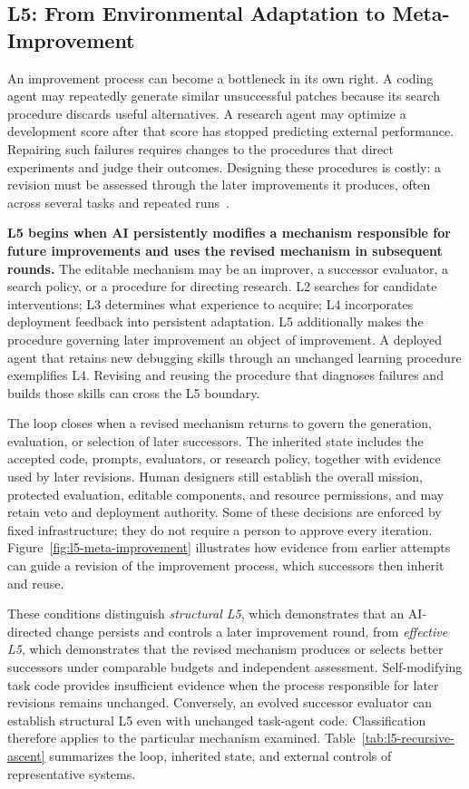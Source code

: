 \subsection{L5: From Environmental Adaptation to Meta-Improvement}
\label{sec:l5-meta-improvement}

An improvement process can become a bottleneck in its own right. A coding agent may repeatedly generate similar unsuccessful patches because its search procedure discards useful alternatives. A research agent may optimize a development score after that score has stopped predicting external performance. Repairing such failures requires changes to the procedures that direct experiments and judge their outcomes. Designing these procedures is costly: a revision must be assessed through the later improvements it produces, often across several tasks and repeated runs~\cite{zelikman2024stop,shi2026aevolvetraining}.

\textbf{L5 begins when AI persistently modifies a mechanism responsible for future improvements and uses the revised mechanism in subsequent rounds.} The editable mechanism may be an improver, a successor evaluator, a search policy, or a procedure for directing research. L2 searches for candidate interventions; L3 determines what experience to acquire; L4 incorporates deployment feedback into persistent adaptation. L5 additionally makes the procedure governing later improvement an object of improvement. A deployed agent that retains new debugging skills through an unchanged learning procedure exemplifies L4. Revising and reusing the procedure that diagnoses failures and builds those skills can cross the L5 boundary.

The loop closes when a revised mechanism returns to govern the generation, evaluation, or selection of later successors. The inherited state includes the accepted code, prompts, evaluators, or research policy, together with evidence used by later revisions. Human designers still establish the overall mission, protected evaluation, editable components, and resource permissions, and may retain veto and deployment authority. Some of these decisions are enforced by fixed infrastructure; they do not require a person to approve every iteration. Figure~\ref{fig:l5-meta-improvement} illustrates how evidence from earlier attempts can guide a revision of the improvement process, which successors then inherit and reuse.

These conditions distinguish \emph{structural L5}, which demonstrates that an AI-directed change persists and controls a later improvement round, from \emph{effective L5}, which demonstrates that the revised mechanism produces or selects better successors under comparable budgets and independent assessment. Self-modifying task code provides insufficient evidence when the process responsible for later revisions remains unchanged. Conversely, an evolved successor evaluator can establish structural L5 even with unchanged task-agent code. Classification therefore applies to the particular mechanism examined. Table~\ref{tab:l5-recursive-ascent} summarizes the loop, inherited state, and external controls of representative systems.

